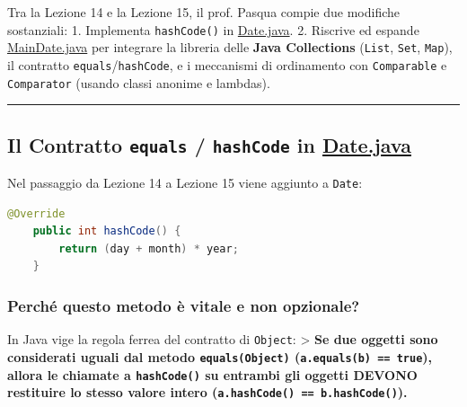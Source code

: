 \documentclass[11pt,a4paper,oneside]{report}
\newcommand{\passthrough}[1]{#1}
\begin{document}
Tra la Lezione 14 e la Lezione 15, il prof. Pasqua compie due modifiche
sostanziali: 1. Implementa \passthrough{\lstinline!hashCode()!} in
\href{file:///home/wally/Documenti/GitHub/Programmazione-II/25-26/Teoria-e-Esercitazioni/Codice-20260902/Lezione15/MavenDate/src/main/java/it/oop/core/Date.java\#L102-L105}{Date.java}.
2. Riscrive ed espande
\href{file:///home/wally/Documenti/GitHub/Programmazione-II/25-26/Teoria-e-Esercitazioni/Codice-20260902/Lezione15/MavenDate/src/main/java/it/oop/ui/MainDate.java}{MainDate.java}
per integrare la libreria delle \textbf{Java Collections}
(\passthrough{\lstinline!List!}, \passthrough{\lstinline!Set!},
\passthrough{\lstinline!Map!}), il contratto
\passthrough{\lstinline!equals!}/\passthrough{\lstinline!hashCode!}, e i
meccanismi di ordinamento con \passthrough{\lstinline!Comparable!} e
\passthrough{\lstinline!Comparator!} (usando classi anonime e lambdas).

\begin{center}\rule{0.5\linewidth}{0.5pt}\end{center}

\subsection{\texorpdfstring{Il Contratto \texttt{equals} /
\texttt{hashCode} in
\href{file:///home/wally/Documenti/GitHub/Programmazione-II/25-26/Teoria-e-Esercitazioni/Codice-20260902/Lezione15/MavenDate/src/main/java/it/oop/core/Date.java\#L102-L105}{Date.java}}{Il Contratto equals / hashCode in Date.java}}\label{chap14_il-contratto-equals-hashcode-in-date.java}

Nel passaggio da Lezione 14 a Lezione 15 viene aggiunto a
\passthrough{\lstinline!Date!}:

\begin{lstlisting}[language=Java]
    @Override
    public int hashCode() {
        return (day + month) * year;
    }
\end{lstlisting}

\subsubsection{Perché questo metodo è vitale e non
opzionale?}\label{chap14_perchuxe9-questo-metodo-uxe8-vitale-e-non-opzionale}

In Java vige la regola ferrea del contratto di
\passthrough{\lstinline!Object!}: \textgreater{} \textbf{Se due oggetti
sono considerati uguali dal metodo
\passthrough{\lstinline!equals(Object)!}
(\passthrough{\lstinline!a.equals(b) == true!}), allora le chiamate a
\passthrough{\lstinline!hashCode()!} su entrambi gli oggetti DEVONO
restituire lo stesso valore intero
(\passthrough{\lstinline!a.hashCode() == b.hashCode()!}).}
\end{document}
